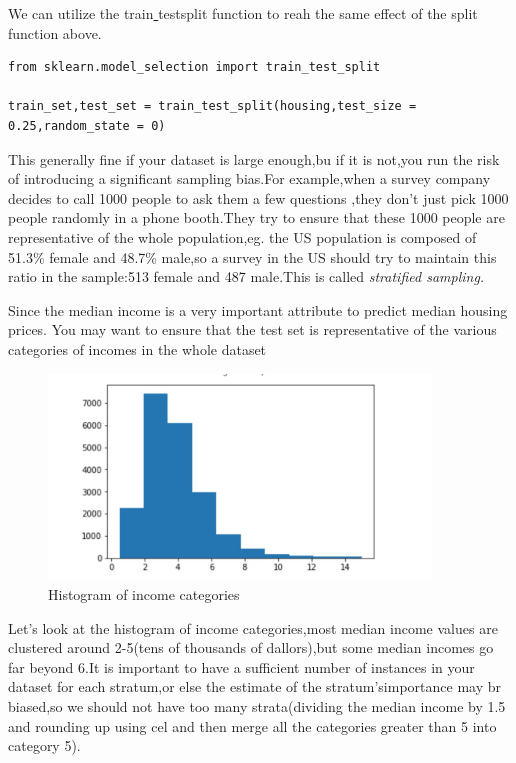 \documentclass[UTF8]{ctexart}
\begin{document}
We can utilize the train\underline{ }test\underline{}split function to reah the same effect of the split function above.

\begin{lstlisting}
from sklearn.model_selection import train_test_split

train_set,test_set = train_test_split(housing,test_size = 0.25,random_state = 0)

\end{lstlisting}
This generally fine if your dataset is large enough,bu if it is not,you run the risk of introducing a significant sampling bias.For example,when a survey company decides to call 1000 people to ask them a few questions ,they don't just pick 1000 people randomly in a phone booth.They try to ensure that these 1000 people are representative of the whole population,eg. the US population is composed of 51.3\% female and 48.7\% male,so a survey in the US should try to maintain this ratio in the sample:513 female and 487 male.This is called \emph{stratified sampling.}

Since the median income is a very important attribute to predict median housing prices. You may want to ensure that the test set is representative of the various categories of incomes in the whole dataset 

\begin{figure}[H]
\centering
\includegraphics[width = 4in]{incomehist.JPG}
\caption{Histogram of income categories}
\end{figure}

Let's look at the histogram of income categories,most median income values are clustered around 2-5(tens of thousands of dallors),but some median incomes go far beyond 6.It is important to have a sufficient number of instances in your dataset for each stratum,or else the estimate of the stratum'simportance may br biased,so we should not have too many strata(dividing the median income by 1.5 and rounding up using cel and then merge all the categories greater than 5 into category 5).
\end{document}
